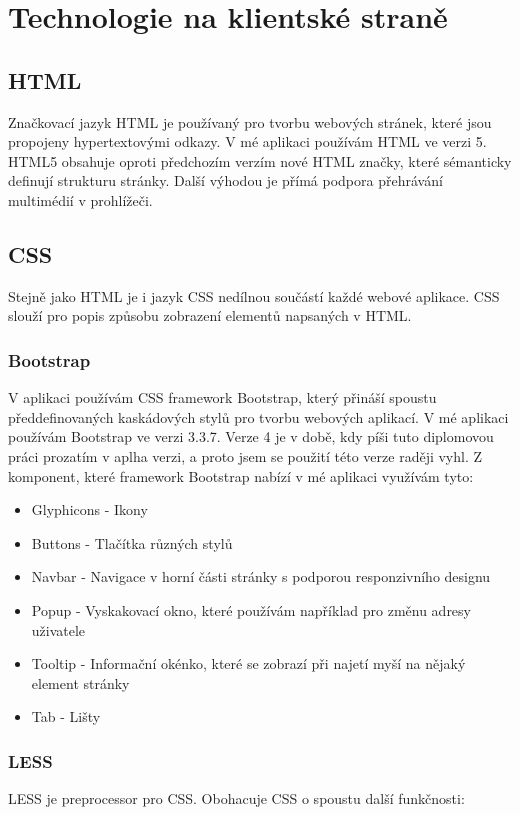 \section{Technologie na klientské straně}

\subsection{HTML}
Značkovací jazyk HTML je používaný pro tvorbu webových stránek, které jsou propojeny hypertextovými odkazy. V mé aplikaci používám HTML ve verzi 5. HTML5 obsahuje oproti předchozím verzím nové HTML značky, které sémanticky definují strukturu stránky. Další výhodou je přímá podpora přehrávání multimédií v prohlížeči.

\subsection{CSS}
Stejně jako HTML je i jazyk CSS nedílnou součástí každé webové aplikace. CSS slouží pro popis způsobu zobrazení elementů napsaných v HTML.

\subsubsection{Bootstrap}
V aplikaci používám CSS framework Bootstrap, který přináší spoustu předdefinovaných kaskádových stylů pro tvorbu webových aplikací. V mé aplikaci používám Bootstrap ve verzi 3.3.7. Verze 4 je v době, kdy píši tuto diplomovou práci prozatím v aplha verzi, a proto jsem se použití této verze raději vyhl. Z komponent, které framework Bootstrap nabízí v mé aplikaci využívám tyto:
\begin{itemize}
    \item Glyphicons - Ikony
	\item Buttons - Tlačítka různých stylů
	\item Navbar - Navigace v horní části stránky s podporou responzivního designu
	\item Popup - Vyskakovací okno, které používám například pro změnu adresy uživatele
	\item Tooltip - Informační okénko, které se zobrazí při najetí myší na nějaký element stránky
	\item Tab - Lišty
\end{itemize}

\subsubsection{LESS}
LESS je preprocessor pro CSS. Obohacuje CSS o spoustu další funkčnosti:

